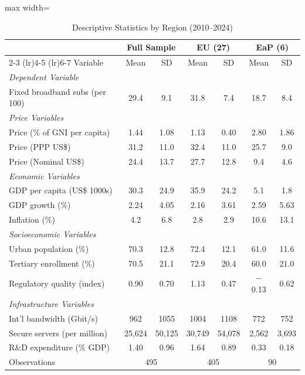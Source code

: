 \begin{table}[htbp]
\centering
\caption{Descriptive Statistics by Region (2010--2024)}
\label{tab:descriptives}
\begin{threeparttable}
\begin{adjustbox}{max width=\textwidth}
\small
\begin{tabular}{lcccccc}
\toprule
& \multicolumn{2}{c}{Full Sample} & \multicolumn{2}{c}{EU (27)} & \multicolumn{2}{c}{EaP (6)} \\
\cmidrule(lr){2-3} \cmidrule(lr){4-5} \cmidrule(lr){6-7}
Variable & Mean & SD & Mean & SD & Mean & SD \\
\midrule
\textit{Dependent Variable} \\
Fixed broadband subs (per 100) & 29.4 & 9.1 & 31.8 & 7.4 & 18.7 & 8.4 \\
\addlinespace
\textit{Price Variables} \\
Price (\% of GNI per capita) & 1.44 & 1.08 & 1.13 & 0.40 & 2.80 & 1.86 \\
Price (PPP US\$) & 31.2 & 11.0 & 32.4 & 11.0 & 25.7 & 9.0 \\
Price (Nominal US\$) & 24.4 & 13.7 & 27.7 & 12.8 & 9.4 & 4.6 \\
\addlinespace
\textit{Economic Variables} \\
GDP per capita (US\$ 1000s) & 30.3 & 24.9 & 35.9 & 24.2 & 5.1 & 1.8 \\
GDP growth (\%) & 2.24 & 4.05 & 2.16 & 3.61 & 2.59 & 5.63 \\
Inflation (\%) & 4.2 & 6.8 & 2.8 & 2.9 & 10.6 & 13.1 \\
\addlinespace
\textit{Socioeconomic Variables} \\
Urban population (\%) & 70.3 & 12.8 & 72.4 & 12.1 & 61.0 & 11.6 \\
Tertiary enrollment (\%) & 70.5 & 21.1 & 72.9 & 20.4 & 60.0 & 21.0 \\
Regulatory quality (index) & 0.90 & 0.70 & 1.13 & 0.47 & $-$0.13 & 0.62 \\
\addlinespace
\textit{Infrastructure Variables} \\
Int'l bandwidth (Gbit/s) & 962 & 1055 & 1004 & 1108 & 772 & 752 \\
Secure servers (per million) & 25{,}624 & 50{,}125 & 30{,}749 & 54{,}078 & 2{,}562 & 3{,}693 \\
R\&D expenditure (\% GDP) & 1.40 & 0.96 & 1.64 & 0.89 & 0.33 & 0.18 \\
\midrule
Observations & \multicolumn{2}{c}{495} & \multicolumn{2}{c}{405} & \multicolumn{2}{c}{90} \\

\end{tabular}
\end{adjustbox}
\end{threeparttable}
\end{table}
